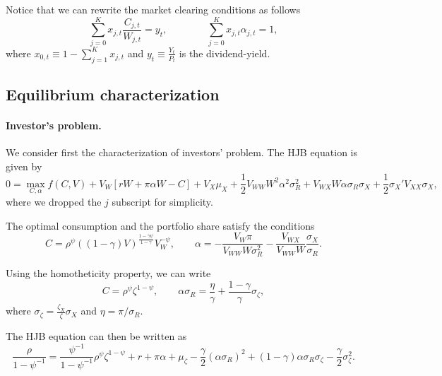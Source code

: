 \documentclass[11pt,english]{article}
\begin{document}
Notice that we can rewrite the market clearing conditions as follows
\begin{equation*}
    \sum_{j=0}^K x_{j,t} \frac{C_{j,t}}{W_{j,t}} = y_t, \qquad \qquad 
    \sum_{j=0}^K x_{j,t} \alpha_{j,t}  = 1,
\end{equation*}
where $x_{0,t} \equiv 1- \sum_{j=1}^K x_{j,t}$ and $y_t \equiv \frac{Y_t}{P_t}$ is the dividend-yield.

\subsection{Equilibrium characterization}

\paragraph{Investor's problem.} We consider first the characterization of investors' problem. The HJB equation is given by
\begin{equation*}
    0 = \max_{C, \alpha} f(C,V) + V_W\left[ r W + \pi \alpha W  - C\right] +V_X \mu_X+ \frac{1}{2} V_{WW} W^2 \alpha^2 \sigma_R^2 + V_{WX} W \alpha \sigma_R \sigma_X + \frac{1}{2} \sigma_X' V_{XX} \sigma_X,
\end{equation*}
where we dropped the $j$ subscript for simplicity.

The optimal consumption and the portfolio share satisfy the conditions
\begin{equation*}
 C = \rho^\psi ((1-\gamma) V)^{\frac{1-\gamma\psi }{1-\gamma}}V_W^{-\psi}, \qquad     \alpha = -\frac{V_{W} \pi}{V_{WW} W \sigma_R^2}   - \frac{V_{WX}}{V_{WW} W} \frac{\sigma_X}{\sigma_R}.
\end{equation*}

Using the homotheticity property, we can write
\begin{equation*}
    C = \rho^\psi \zeta^{1-\psi}, \qquad \alpha \sigma_R = \frac{\eta}{\gamma} +  \frac{1-\gamma}{\gamma} \sigma_{\zeta},
\end{equation*}
where $\sigma_\zeta = \frac{\zeta_X}{\zeta} \sigma_X$ and $\eta = \pi/\sigma_R $.



The HJB equation can then be written as
\begin{equation*}
     \frac{\rho}{1-\psi^{-1}} =
     \frac{\psi^{-1}}{1-\psi^{-1}} \rho^{\psi} \zeta^{1-\psi} + r + \pi \alpha + \mu_\zeta - \frac{\gamma}{2} (\alpha \sigma_R)^2 + (1-\gamma) \alpha \sigma_R \sigma_\zeta - \frac{\gamma}{2} \sigma_\zeta^2.
\end{equation*}
\end{document}
